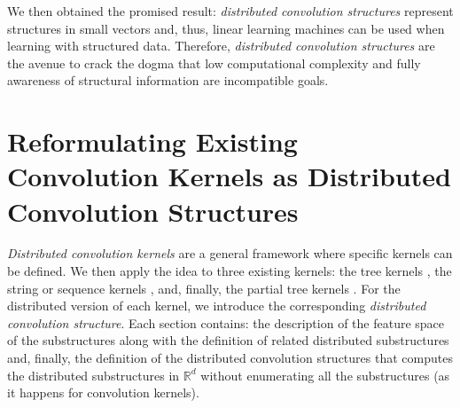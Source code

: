 \documentclass[twoside,11pt]{article}
\def\R{\mathbb{R}}
\def\comment#1#2{}
\begin{document}
We then obtained the promised result: \emph{distributed convolution structures} represent structures in small vectors and, thus, linear learning machines can be used when learning with structured data. Therefore, \emph{distributed convolution structures} are the avenue to crack the dogma that low computational complexity and fully awareness of structural information are incompatible goals.






\section{Reformulating Existing Convolution Kernels as Distributed Convolution Structures\comment{REVISED}{}}
\label{sec:attk}

\comment{[R3,C10][IssueC][IssueE]}{Section 4 is the most important in the paper, since it introduces the actual approach taken by the authors, which is not, as was suggested in Section 3 or 2, to embed subtree structures in $R^d$, but is instead to define a mapping directly from trees to $R^d$ using a rule defined in Definition 3. Although I believe some of these ideas are useful, they read at this point like a series of hacks, most of which were described in Plate ('94) [is there a more definitive reference for this approach than a Ph.D thesis?]. What is probably the most frustrating from a Machine Learning perspective is that none of these approximations learn from data: they are all defined ad-hoc using elementary intuitions and checking that these intuitions have numerical consequences (Figure 3,4,5). While a large challenge of kernel methods in recent years has been to learn compact representations using data (Nystrom, incomplete cholesky etc...) none of this is ever mentioned here.}


\comment{[R3,C14][IssueF]}{Section 4 does not clearly improve on Section 5.1 in the ICML paper.}




\emph{Distributed convolution kernels} are a general framework where specific kernels can be defined. We then apply the idea to three existing kernels: the tree kernels \cite{Collins2002}, 
the string or sequence kernels \cite{Lodhi:2002:TCU:944790.944799}, and, finally, the partial tree kernels \cite{Kashima:2002:KSD:645531.656021,Moschitti2006b}.  For the distributed version of each kernel, we introduce the corresponding \emph{distributed convolution structure}. Each section contains: the description of the feature space of the substructures along with the definition of related distributed substructures and, finally, the definition of the distributed convolution structures that computes the distributed substructures in $\R^d$ without enumerating all the substructures (as it happens for convolution kernels). 
\end{document}
